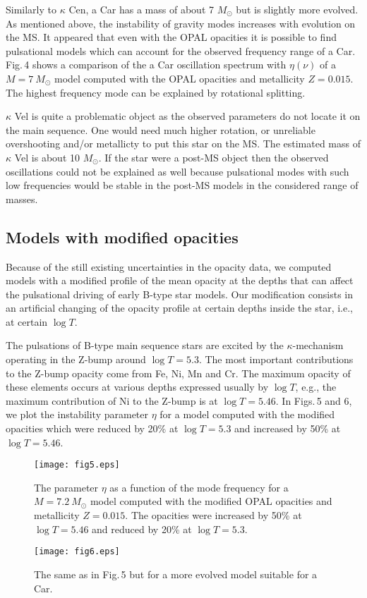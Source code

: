 \documentclass{ptapap}
\begin{document}
Similarly to $\kappa$ Cen, a Car has a mass of about 7 $M_\odot$ but is slightly more evolved.
As mentioned above, the instability of gravity modes increases with evolution on the MS. It appeared that even with the OPAL opacities
it is possible to find pulsational models which can account for the observed frequency range of a Car.
Fig.\,4 shows a comparison of the a Car oscillation spectrum with $\eta(\nu)$ of a $M=7~M_\odot$ model computed with the OPAL opacities and metallicity $Z=0.015$.
The highest frequency mode can be explained by rotational splitting.

$\kappa$ Vel is quite a problematic object as the observed parameters do not locate it on the main sequence.
One would need much higher rotation, or unreliable overshooting and/or metallicty to put this star on the MS.
The estimated mass of $\kappa$ Vel is about 10 $M_\odot$. If the star were a post-MS object
then the observed oscillations could not be explained as well because pulsational modes with such low frequencies
would be stable in the post-MS models in the considered range of masses.

\subsection{Models with modified opacities}

Because of the still existing uncertainties in the opacity data, we computed models with a modified profile
of the mean opacity at the depths that can affect the pulsational driving of early B-type star models.
Our modification consists in an artificial changing of the opacity profile at certain depths inside the star, i.e., at certain $\log T$.

The pulsations of B-type main sequence stars are excited by the $\kappa$-mechanism operating in the Z-bump around $\log T=5.3$.
The most important contributions to the Z-bump opacity come from Fe, Ni, Mn and Cr.
The maximum opacity of these elements occurs at various depths expressed usually by $\log T$, e.g.,
the maximum contribution of Ni to the Z-bump is at $\log T=5.46$.
In Figs.\,5 and 6, we plot the instability parameter $\eta$ for a model computed with the modified opacities
which were reduced by 20\% at $\log T=5.3$ and increased by 50\% at $\log T=5.46$.
%
\begin{figure}[h]
  \centering
\begin{minipage}{0.48\textwidth}
    \texttt{[image: fig5.eps]}
    \caption{The parameter $\eta$ as a function of the mode frequency for a $M=7.2~M_\odot$ model computed with the modified OPAL opacities and metallicity $Z=0.015$. The opacities were increased by 50\% at $\log T=5.46$ and reduced by 20\% at $\log T=5.3$.}
    \label{fig:fig5}
  \end{minipage}
  \quad
  \begin{minipage}{0.48\textwidth}
    \texttt{[image: fig6.eps]}
    \caption{The same as in Fig.\,5 but for a more evolved model suitable for a Car.}
    \label{fig:fig6}
  \end{minipage}
\end{figure}
\end{document}
